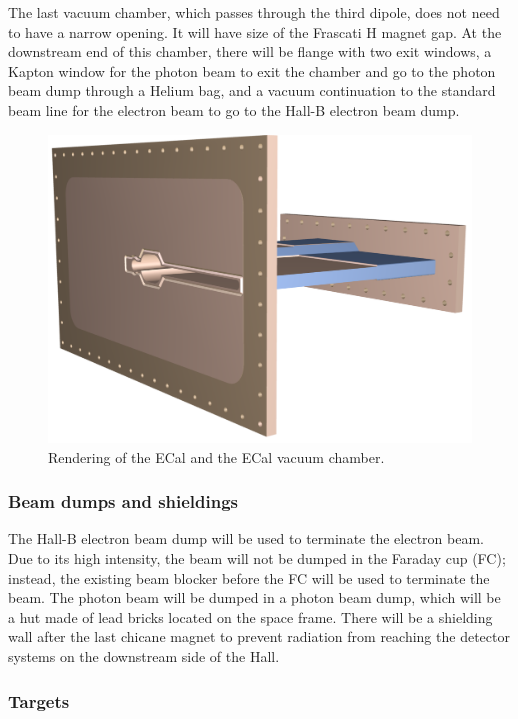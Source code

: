 The last vacuum chamber, which passes through the third dipole, does not need to have a narrow opening. It will have size of the Frascati H magnet 
gap. At the downstream end of this chamber, there will be flange with two exit windows, a Kapton window for the photon beam to exit the chamber 
and go to 
the photon beam dump through a Helium bag, and a vacuum continuation to the standard beam line for the electron beam to go to the Hall-B 
electron beam dump. 

\begin{figure}[t]
\includegraphics[scale=0.25]{beamline/ecal_vac.pdf}
\caption{\small{Rendering of the ECal and the ECal vacuum chamber.}}\label{fig:ecalv}
\end{figure}
 
\subsubsection{Beam dumps and shieldings} 

The Hall-B electron beam dump will be used to terminate the electron beam. Due to its high intensity, the beam will not be dumped in the Faraday 
cup (FC); instead, the existing beam blocker before the FC will be used to terminate the beam. The photon beam will be dumped in a photon beam dump, 
which will be a hut  made of lead bricks located on the space frame. There will be a shielding wall after the last chicane magnet to prevent 
radiation from reaching the detector systems on the downstream side of the Hall.

\subsubsection{Targets} 
\label{target}

